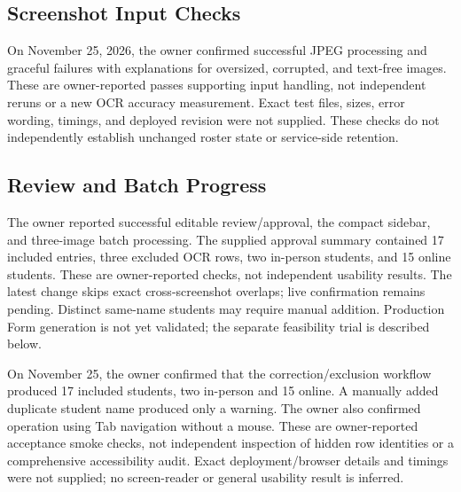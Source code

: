 \subsection{Screenshot Input Checks}
On November 25, 2026, the owner confirmed successful JPEG processing and
graceful failures with explanations for oversized, corrupted, and text-free
images. These are owner-reported passes supporting input handling, not
independent reruns or a new OCR accuracy measurement. Exact test files, sizes,
error wording, timings, and deployed revision were not supplied. These checks
do not independently establish unchanged roster state or service-side retention.

\subsection{Review and Batch Progress}
The owner reported successful editable review/approval, the compact sidebar,
and three-image batch processing. The supplied approval summary contained 17
included entries, three excluded OCR rows, two in-person students, and 15 online
students. These are owner-reported checks, not independent usability results.
The latest change skips exact cross-screenshot overlaps; live confirmation
remains pending. Distinct same-name students may require manual addition.
Production Form generation is not yet validated; the separate feasibility trial
is described below.

On November 25, the owner confirmed that the correction/exclusion workflow
produced 17 included students, two in-person and 15 online. A manually added
duplicate student name produced only a warning. The owner also confirmed
operation using Tab navigation without a mouse. These are owner-reported
acceptance smoke checks, not independent inspection of hidden row identities
or a comprehensive accessibility audit. Exact deployment/browser details and
timings were not supplied; no screen-reader or general usability result is inferred.

